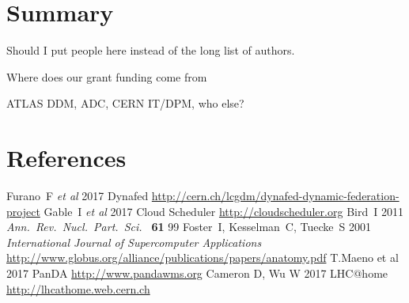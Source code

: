 \documentclass[a4paper]{jpconf}
\begin{document}
\section{Summary}


\ack
Should I put people here instead of the long list of authors.

Where does our grant funding come from

ATLAS DDM, ADC, CERN IT/DPM, who else?


\section*{References}
\begin{thebibliography}{9}
  Furano~F {\it et al}
  2017
  Dynafed
  \url{http://cern.ch/lcgdm/dynafed-dynamic-federation-project}
  Gable~I {\it et al}
  2017
  Cloud Scheduler
  \url{http://cloudscheduler.org}
  Bird~I
  2011
  {\it Ann.\ Rev.\ Nucl.\ Part.\ Sci.\ } {\bf 61} 99
  Foster~I, Kesselman~C, Tuecke~S
  2001
  {\it International Journal of Supercomputer Applications}
  \url{http://www.globus.org/alliance/publications/papers/anatomy.pdf}
  T.Maeno et al
  2017
  PanDA
  \url{http://www.pandawms.org}
  Cameron D, Wu W
  2017
  LHC@home
  \url{http://lhcathome.web.cern.ch}



\end{thebibliography}
\end{document}
